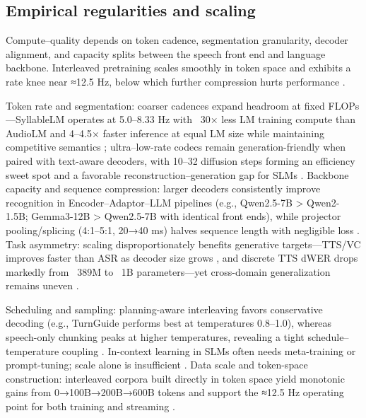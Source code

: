 \documentclass{article}
\begin{document}
\subsection{Empirical regularities and scaling} \label{subsec:Empirical regularities and scaling}
Compute–quality depends on token cadence, segmentation granularity, decoder alignment, and capacity splits between the speech front end and language backbone. Interleaved pretraining scales smoothly in token space and exhibits a rate knee near ≈12.5 Hz, below which further compression hurts performance \cite{zeng2024scalingspeechtextpretrainingsyntheticint}.

Token rate and segmentation: coarser cadences expand headroom at fixed FLOPs—SyllableLM operates at 5.0–8.33 Hz with ~30× less LM training compute than AudioLM and 4–4.5× faster inference at equal LM size while maintaining competitive semantics \cite{baade2024syllablelmlearningcoarsesemanticunitsspe}; ultra–low-rate codecs remain generation-friendly when paired with text-aware decoders, with 10–32 diffusion steps forming an efficiency sweet spot and a favorable reconstruction–generation gap for SLMs \cite{wang2025tadicodectextawarediffusionspeechtokeniz}. Backbone capacity and sequence compression: larger decoders consistently improve recognition in Encoder–Adaptor–LLM pipelines (e.g., Qwen2.5-7B > Qwen2-1.5B; Gemma3-12B > Qwen2.5-7B with identical front ends), while projector pooling/splicing (4:1–5:1, 20→40 ms) halves sequence length with negligible loss \cite{li2025transsionmultilingualspeechrecognitionsy,nguyen2025qwenvsgemmaintegrationwhispercomparative}. Task asymmetry: scaling disproportionately benefits generative targets—TTS/VC improves faster than ASR as decoder size grows \cite{wu2024speechcomposerunifyingmultiplespeechtask}, and discrete TTS dWER drops markedly from ~389M to ~1B parameters—yet cross-domain generalization remains uneven \cite{wang2024evaluatingtextspeechsynthesislargediscre,huang2025dynamicsuperbphase2collaborativelyexpand}.

Scheduling and sampling: planning-aware interleaving favors conservative decoding (e.g., TurnGuide performs best at temperatures 0.8–1.0), whereas speech-only chunking peaks at higher temperatures, revealing a tight schedule–temperature coupling \cite{cui2025thinkbeforeyoutalkenhancingmeaningfuldia}. In-context learning in SLMs often needs meta-training or prompt-tuning; scale alone is insufficient \cite{hsu2024exploringcontextlearningtextlessspeechla}. Data scale and token-space construction: interleaved corpora built directly in token space yield monotonic gains from 0→100B→200B→600B tokens and support the ≈12.5 Hz operating point for both training and streaming \cite{zeng2024scalingspeechtextpretrainingsyntheticint}.
\end{document}

